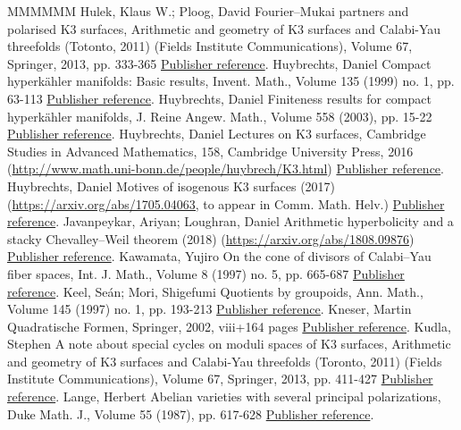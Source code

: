 \documentclass[11pt]{article}
\theoremstyle{definition}
\numberwithin{equation}{section}
\numberwithin{figure}{section}
\numberwithin{table}{section}
\begin{document}
\begin{thebibliography}{MMMMMM}
 Hulek, Klaus W.; Ploog, David Fourier–Mukai partners and polarised K3 surfaces, Arithmetic and geometry of K3 surfaces and Calabi-Yau threefolds (Totonto, 2011) (Fields Institute Communications), Volume 67, Springer, 2013, pp. 333-365 \href{https://ahl.centre-mersenne.org/item/AHL_2018__1__227_0/#HP}{Publisher reference}.
 Huybrechts, Daniel Compact hyperkähler manifolds: Basic results, Invent. Math., Volume 135 (1999) no. 1, pp. 63-113 \href{https://ahl.centre-mersenne.org/item/AHL_2018__1__227_0/#HuyHK}{Publisher reference}.
 Huybrechts, Daniel Finiteness results for compact hyperkähler manifolds, J. Reine Angew. Math., Volume 558 (2003), pp. 15-22 \href{https://ahl.centre-mersenne.org/item/AHL_2018__1__227_0/#HuyFin}{Publisher reference}.
 Huybrechts, Daniel Lectures on K3 surfaces, Cambridge Studies in Advanced Mathematics, 158, Cambridge University Press, 2016 (\url{http://www.math.uni-bonn.de/people/huybrech/K3.html}) \href{https://ahl.centre-mersenne.org/item/AHL_2018__1__227_0/#HuyK3}{Publisher reference}.
 Huybrechts, Daniel Motives of isogenous K3 surfaces (2017) (\url{https://arxiv.org/abs/1705.04063,} to appear in Comm. Math. Helv.) \href{https://ahl.centre-mersenne.org/item/AHL_2018__1__227_0/#HuyMot}{Publisher reference}.
 Javanpeykar, Ariyan; Loughran, Daniel Arithmetic hyperbolicity and a stacky Chevalley–Weil theorem (2018) (\url{https://arxiv.org/abs/1808.09876}) \href{https://ahl.centre-mersenne.org/item/AHL_2018__1__227_0/#JL}{Publisher reference}.
 Kawamata, Yujiro On the cone of divisors of Calabi–Yau fiber spaces, Int. J. Math., Volume 8 (1997) no. 5, pp. 665-687 \href{https://ahl.centre-mersenne.org/item/AHL_2018__1__227_0/#Kaw}{Publisher reference}.
 Keel, Seán; Mori, Shigefumi Quotients by groupoids, Ann. Math., Volume 145 (1997) no. 1, pp. 193-213 \href{https://ahl.centre-mersenne.org/item/AHL_2018__1__227_0/#KM}{Publisher reference}.
 Kneser, Martin Quadratische Formen, Springer, 2002, viii+164 pages \href{https://ahl.centre-mersenne.org/item/AHL_2018__1__227_0/#Kneser}{Publisher reference}.
 Kudla, Stephen A note about special cycles on moduli spaces of K3 surfaces, Arithmetic and geometry of K3 surfaces and Calabi-Yau threefolds (Toronto, 2011) (Fields Institute Communications), Volume 67, Springer, 2013, pp. 411-427 \href{https://ahl.centre-mersenne.org/item/AHL_2018__1__227_0/#Kudla}{Publisher reference}.
 Lange, Herbert Abelian varieties with several principal polarizations, Duke Math. J., Volume 55 (1987), pp. 617-628 \href{https://ahl.centre-mersenne.org/item/AHL_2018__1__227_0/#La}{Publisher reference}.

\end{thebibliography}
\end{document}
